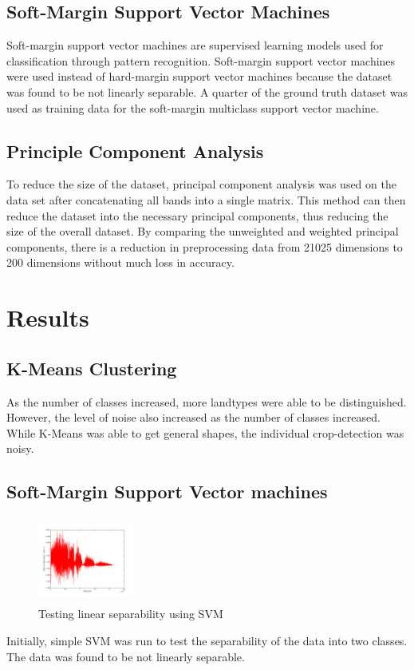 \documentclass[10pt,letterpaper]{article}
\begin{document}
\subsection{Soft-Margin Support Vector Machines}
Soft-margin support vector machines are supervised learning models used for classification through pattern recognition. Soft-margin support vector machines were used instead of hard-margin support vector machines because the dataset was found to be not linearly separable. A quarter of the ground truth dataset was used as training data for the soft-margin multiclass support vector machine.
\subsection{Principle Component Analysis}
To reduce the size of the dataset, principal component analysis was used on the data set after concatenating all bands into a single matrix. This method can then reduce the dataset into the necessary principal components, thus reducing the size of the overall dataset. By comparing the unweighted and weighted principal components, there is a reduction in preprocessing data from 21025 dimensions to 200 dimensions without much loss in accuracy.
\section{Results}
\subsection{K-Means Clustering}
As the number of classes increased, more landtypes were able to be distinguished. However, the level of noise also increased as the number of classes increased. While K-Means was able to get general shapes, the individual crop-detection was noisy.
\subsection{Soft-Margin Support Vector machines}
\begin{figure}\vspace{-20pt}
\begin{center}
\includegraphics[width=0.28\textwidth, height=80pt]{../Presentation/softsvmImage.png}
\caption{Testing linear separability using SVM}
\end{center}
\end{figure}
Initially, simple SVM was run to test the separability of the data into two classes. The data was found to be not linearly separable.
\end{document}
